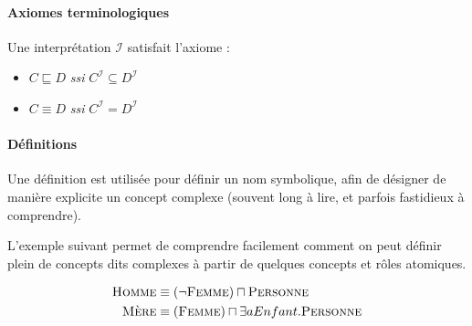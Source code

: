 \paragraph{Axiomes terminologiques}
\label{sec:axiom-term}

\par Une interprétation $\mathcal{I}$ satisfait l'axiome :
\begin{itemize}
\item $C\sqsubseteq D$ \emph{ssi} $C^{\mathcal{I}} \subseteq D^{\mathcal{I}}$
\item $C\equiv D$ \emph{ssi} $C^{\mathcal{I}} = D^{\mathcal{I}}$
\end{itemize}




\paragraph{Définitions}
\label{sec:definitions}

\par Une définition est utilisée pour définir un nom symbolique, afin de désigner de manière explicite un concept complexe (souvent long à lire, et parfois fastidieux à comprendre).

\par L'exemple suivant permet de comprendre facilement comment on peut définir plein de concepts dits complexes à partir de quelques concepts et rôles atomiques.

\begin{exemple}
  \begin{align}
    \textsc{Homme} & \equiv (\neg \textsc{Femme})\sqcap\textsc{Personne} \\
    \textsc{Mère} & \equiv (\textsc{Femme})\sqcap\exists aEnfant.\textsc{Personne}
  \end{align}
\end{exemple}

